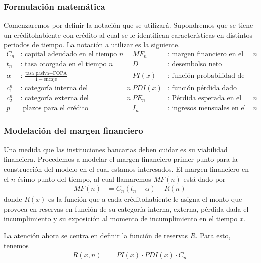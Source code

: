 \subsubsection{Formulación matemática}
Comenzaremos por definir la notación que se utilizará. Supondremos que se tiene un créditohabiente con crédito al cual se le identifican características en distintos periodos de tiempo. La notación a utilizar es la siguiente.
\begin{align*}
    C_n & \text{: capital adeudado en el tiempo $n$} & MF_n & \text{: margen financiero en el tiempo $n$} \\
    t_n & \text{: tasa otorgada en el tiempo $n$} & D & \text{: desembolso neto} \\
    \alpha & \text{: } \frac{\text{tasa pasiva} + \text{FOPA}}{1- \text{encaje}} & PI(x) & \text{: función probabilidad de incumplimiento} \\
    c_1^n & \text{: categoría interna del créditohabiente en el tiempo $n$} & PDI(x) & \text{: función pérdida dado incumplimiento} \\
    c_2^n & \text{: categoría externa del créditohabiente en el tiempo $n$} & PE_n & \text{: Pérdida esperada en el tiempo $n$} \\
    p & \text{ plazos para el crédito} & I_n & \text{: ingresos mensuales en el tiempo $n$} 
\end{align*}

\subsubsection{Modelación del margen financiero}

Una medida que las instituciones bancarias deben cuidar es su viabilidad financiera. Procedemos a modelar el margen financiero primer punto para la construcción del modelo en el cual estamos interesados.  El margen financiero en el $n$-ésimo punto del tiempo, al cual llamaremos $MF(n)$ está dado por
\begin{align*}
    MF(n) &= C_n(t_n-\alpha) - R(n)
\end{align*}
donde $R(x)$ es la función que a cada créditohabiente le asigna el monto que provoca en reservas en función de su categoría interna, externa, pérdida dada el incumplimiento y su exposición al momento de incumplimiento en el tiempo $x$. 

La atención ahora se centra en definir la función de reservas $R$. Para esto, tenemos
\begin{align*}
    R(x, n) &= PI(x)\cdot PDI(x) \cdot C_n
\end{align*}


